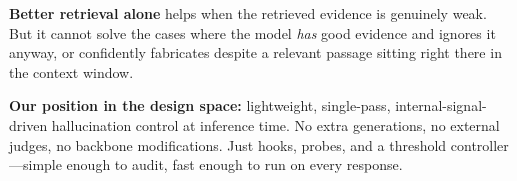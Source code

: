 \textbf{Better retrieval alone} helps when the retrieved evidence is genuinely weak. But it cannot solve the cases where the model \emph{has} good evidence and ignores it anyway, or confidently fabricates despite a relevant passage sitting right there in the context window.

\textbf{Our position in the design space:} lightweight, single-pass, internal-signal-driven hallucination control at inference time. No extra generations, no external judges, no backbone modifications. Just hooks, probes, and a threshold controller—simple enough to audit, fast enough to run on every response.
